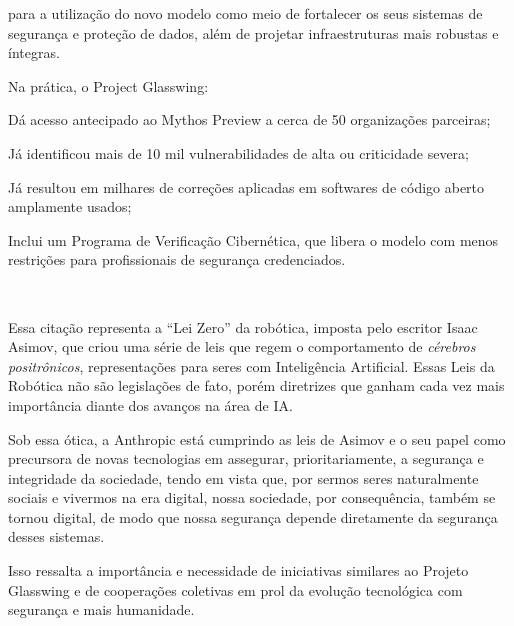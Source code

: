{para a utilização do novo modelo como meio de fortalecer os seus sistemas de segurança e proteção de dados, além de projetar infraestruturas mais robustas e íntegras.


Na prática, o Project Glasswing:

\begin{hypeitemize}
\item Dá acesso antecipado ao Mythos Preview a cerca de 50 organizações parceiras;
\item Já identificou mais de 10 mil vulnerabilidades de alta ou criticidade severa;
\item Já resultou em milhares de correções aplicadas em softwares de código aberto amplamente usados;
\item Inclui um Programa de Verificação Cibernética, que libera o modelo com menos restrições para profissionais de segurança credenciados.
\end{hypeitemize}\

\pagebreak     
\subtitle{Uma reflexão inspirada em Asimov}


Essa citação representa a ``Lei Zero'' da robótica, imposta pelo escritor Isaac Asimov, que criou uma série de leis que regem o comportamento de \textit{cérebros positrônicos}, representações para seres com Inteligência Artificial. Essas Leis da Robótica não são legislações de fato, porém diretrizes que ganham cada vez mais importância diante dos avanços na área de IA.

Sob essa ótica, a Anthropic está cumprindo as leis de Asimov e o seu papel como precursora de novas tecnologias em assegurar, prioritariamente, a segurança e integridade da sociedade, tendo em vista que, por sermos seres naturalmente sociais e vivermos na era digital, nossa sociedade, por consequência, também se tornou digital, de modo que nossa segurança depende diretamente da segurança desses sistemas.

Isso ressalta a importância e necessidade de iniciativas similares ao Projeto Glasswing e de cooperações coletivas em prol da evolução tecnológica com segurança e mais humanidade.


}